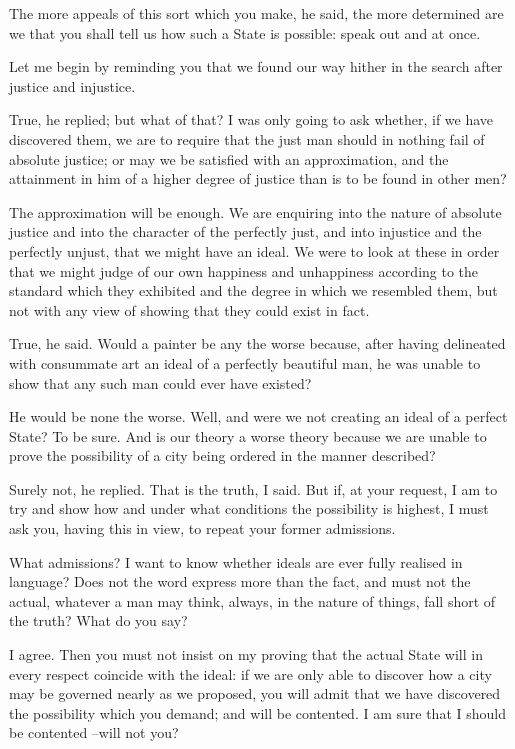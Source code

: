The more appeals of this sort which you make, he said, the more determined are we that you shall tell us how such a State is possible: speak out and at once.

Let me begin by reminding you that we found our way hither in the search after justice and injustice.

True, he replied; but what of that?
I was only going to ask whether, if we have discovered them, we are to require that the just man should in nothing fail of absolute justice; or may we be satisfied with an approximation, and the attainment in him of a higher degree of justice than is to be found in other men?

The approximation will be enough.
We are enquiring into the nature of absolute justice and into the character of the perfectly just, and into injustice and the perfectly unjust, that we might have an ideal. We were to look at these in order that we might judge of our own happiness and unhappiness according to the standard which they exhibited and the degree in which we resembled them, but not with any view of showing that they could exist in fact.

True, he said.
Would a painter be any the worse because, after having delineated with consummate art an ideal of a perfectly beautiful man, he was unable to show that any such man could ever have existed?

He would be none the worse.
Well, and were we not creating an ideal of a perfect State?
To be sure.
And is our theory a worse theory because we are unable to prove the possibility of a city being ordered in the manner described?

Surely not, he replied.
That is the truth, I said. But if, at your request, I am to try and show how and under what conditions the possibility is highest, I must ask you, having this in view, to repeat your former admissions.

What admissions?
I want to know whether ideals are ever fully realised in language? Does not the word express more than the fact, and must not the actual, whatever a man may think, always, in the nature of things, fall short of the truth? What do you say?

I agree.
Then you must not insist on my proving that the actual State will in every respect coincide with the ideal: if we are only able to discover how a city may be governed nearly as we proposed, you will admit that we have discovered the possibility which you demand; and will be contented. I am sure that I should be contented --will not you?

